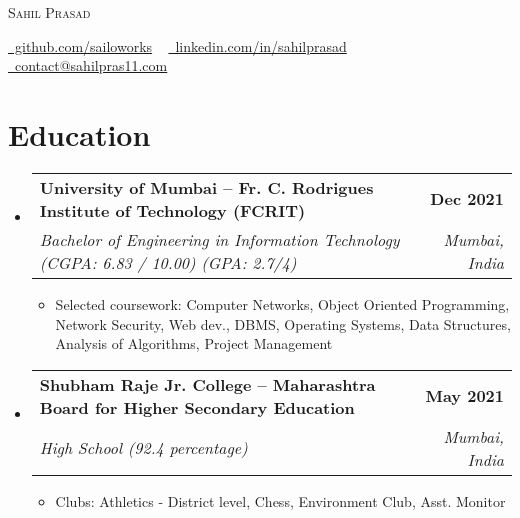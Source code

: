\documentclass[letterpaper,11pt]{article}
\makeatletter
\newcommand{\resumeItem}[1]{
  \item\small{
    {#1 \vspace{0pt}}
  }
}
\newcommand{\resumeSubheading}[4]{
  \vspace{0pt}\item
    \begin{tabular*}{1.0\textwidth}[t]{l@{\extracolsep{\fill}}r}
      \vspace{0pt}\textbf{#1} & \textbf{\small #2} \\
      \textit{\small#3} & \textit{\small #4} \\
    \end{tabular*}\vspace{0pt}
}
\newcommand{\resumeSubHeadingListStart}{\begin{itemize}[leftmargin=0.0in, label={}]}
\newcommand{\resumeSubHeadingListEnd}{\end{itemize}}
\newcommand{\resumeItemListStart}{\begin{itemize}}
\newcommand{\resumeItemListEnd}{\end{itemize}\vspace{0pt}}
\makeatother
\begin{document}

\begin{center}
    {\huge \scshape Sahil Prasad} \\ \vspace{5pt}
    \small
    
    \faGithub \href{https://github.com/sailorworks}{\raisebox{-0.2\height}\ github.com/sailoworks} ~
    \faLinkedin \href{https://www.linkedin.com/in/sahil-prasad-/}{\raisebox{-0.2\height}\ linkedin.com/in/sahilprasad} ~
    \faEnvelope \href{mailto:sahilpras11@gmail.com}{\raisebox{-0.2\height}\  contact@sahilpras11.com}
    \vspace{-8pt}
\end{center}


\section{Education}
    \vspace{3pt}
    \resumeSubHeadingListStart
        \resumeSubheading
            {University of Mumbai --  Fr. C. Rodrigues Institute of Technology (FCRIT)}{Dec 2021}
            {Bachelor of Engineering in Information Technology (CGPA: 6.83 / 10.00) (GPA: 2.7/4)}{Mumbai, India}
            \resumeItemListStart
                \resumeItem{Selected coursework: Computer Networks, Object Oriented Programming, Network Security, Web dev., DBMS, Operating Systems, Data Structures, Analysis of Algorithms, Project Management}
            \resumeItemListEnd
        \vspace{0pt}

        \resumeSubheading
            {Shubham Raje Jr. College -- Maharashtra Board for Higher Secondary Education}{May 2021}
            {High School (92.4 percentage)}{Mumbai, India}
            \resumeItemListStart
                \resumeItem{Clubs: Athletics - District level, Chess, Environment Club, Asst. Monitor}
            \resumeItemListEnd
    \resumeSubHeadingListEnd
\vspace{-8pt}
\end{document}
